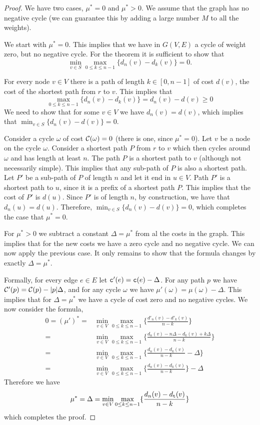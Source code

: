 \begin{proof}
We have two cases, $\mu^*=0$ and $\mu^*>0$. We assume that the graph
has no negative cycle (we can guarantee this by adding a large
number $M$ to all the weights).

We start with $\mu^*=0$. This implies that we have in $G(V,E)$ a
cycle of weight zero, but no negative cycle. For the theorem it is
sufficient to show that
\[
\min_{v\in S} \max_{0\leq k \leq n-1} \{d_n(v)-d_{k}(v)\}=0.
\]

For every node $v\in V$ there is a path of length $k\in[0,n-1]$ of
cost $d(v)$, the cost of the shortest path from $r$ to $v$. This
implies that
\[
\max_{0\leq k \leq n-1} \{d_n(v)-d_{k}(v)\}=d_n(v)-d(v)\geq 0
\]
We need to show that for some $v\in V$ we have $d_n(v)=d(v)$, which
implies that $\min_{v\in S} \{d_n(v)-d(v)\}=0$.

Consider a cycle $\omega$ of cost $\mathcal{C}(\omega)=0$ (there is one,
since $\mu^*=0$). Let $v$ be a node on the cycle $\omega$. Consider
a shortest path $P$ from $r$ to $v$ which then cycles around $\omega$ and has
length at least $n$. The path $P$ is a shortest path to $v$
(although not necessarily simple). This implies that any sub-path of
$P$ is also a shortest path. Let $P'$ be a sub-path of $P$ of length
$n$ and let it end in $u\in V$.
%
Path $P'$ is a shortest path to $u$, since it is a prefix of a
shortest path $P$.
%
This implies that the cost of $P'$ is $d(u)$. Since $P'$ is of
length $n$, by construction, we have that $d_n(u)=d(u)$. Therefore,
$\min_{v\in S} \{d_n(v)-d(v)\}=0$, which completes the case that
$\mu^*=0$.

For $\mu^*>0$ we subtract a constant $\Delta=\mu^*$ from al the
costs in the graph. This implies that for the new costs we have a
zero cycle and no negative cycle. We can now apply the previous
case. It only remains to show that the formula changes by exactly
$\Delta=\mu^*$.

Formally, for every edge $e\in E$ let ${\tt c}'(e)={\tt c}(e)-\Delta$.
For any path $p$ we have $\mathcal{C}'(p)=\mathcal{C}(p)-|p|\Delta$, and for any
cycle $\omega$ we have $\mu'(\omega)=\mu(\omega)-\Delta$. This
implies that for $\Delta=\mu^*$ we have a cycle of cost zero and no
negative cycles. We now consider the formula,
\begin{align*}
0=(\mu')^*=&\min_{v\in V} \max_{0\leq k\leq n-1}
\{\frac{d'_n(v)-d'_{k}(v)}{n-k}\}\\
=&\min_{v\in V} \max_{0\leq k\leq n-1}
\{\frac{d_n(v)-n\Delta-d_{k}(v)+k\Delta}{n-k}\}\\
=&\min_{v\in V} \max_{0\leq k\leq n-1}
\{\frac{d_n(v)-d_{k}(v)}{n-k}-\Delta\}\\
=&\min_{v\in V} \max_{0\leq k\leq n-1}
\{\frac{d_n(v)-d_{k}(v)}{n-k}\}-\Delta
\end{align*}
Therefore we have
\[
\mu^*=\Delta=\min_{v\in V} \max_{0\leq k\leq n-1}
\{\frac{d_n(v)-d_{{\tt t}}
(v)}{n-k}\}
\]
which completes the proof.
\end{proof}

